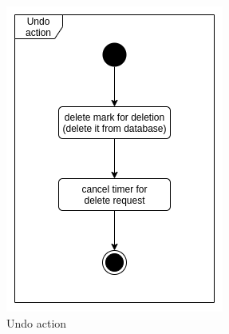 \begin{figure}
\begin{minipage}[b]{0.45\textwidth}
    	\includegraphics[width=\textwidth]{pics/undo/undo_action.png}
    	\caption[Undo action]{Undo action}\label{fig:undoUndo}
    \end{minipage}
\end{figure}